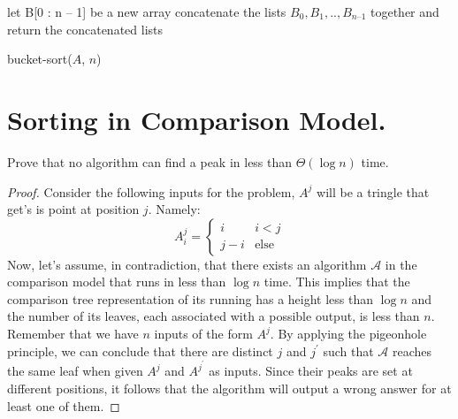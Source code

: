   \begin{algorithm}
    	let B[0 : n – 1] be a new array
	\For{ $i \leftarrow [1, n]$}{
	    insert $A_{i}$ into list $B_{ \lfloor n A_{i} \rfloor} ]$
       	}
	concatenate the lists $B_{0}, B_{1}, .. , B_{n – 1}$ together and\\
	return the concatenated lists
\caption{bucket-sort($A$, $n$)}
  \end{algorithm}

%

\section{Sorting in Comparison Model.}

\begin{example}
  Prove that no algorithm can find a peak in less than $\Theta\left( \log n \right)$ time.
\end{example}
\begin{proof}
  Consider the following inputs for the problem, $A^{j}$ will be a tringle that get's is point at position $j$. Namely:  
  \begin{equation*}
      A^{j}_{i} = \begin{cases}
        i & i < j \\
        j - i & \text{else}
      \end{cases}
  \end{equation*} 
  Now, let's assume, in contradiction, that there exists an algorithm $\mathcal{A}$ in the comparison model that runs in less than $\log n$ time. This implies that the comparison tree representation of its running has a height less than $\log n$ and the number of its leaves, each associated with a possible output, is less than $n$. Remember that we have $n$ inputs of the form $A^{j}$. By applying the pigeonhole principle, we can conclude that there are distinct $j$ and $j^{\prime}$ such that $\mathcal{A}$ reaches the same leaf when given $A^{j}$ and $A^{j^{\prime}}$ as inputs. Since their peaks are set at different positions, it follows that the algorithm will output a wrong answer for at least one of them.
\end{proof}

